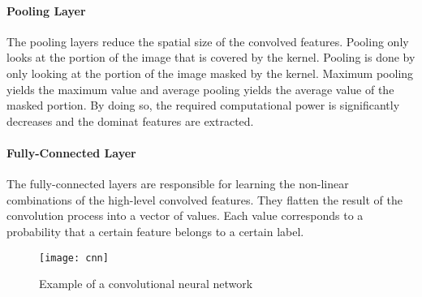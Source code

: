 \paragraph{Pooling Layer}
The pooling layers reduce the spatial size of the convolved features.
Pooling only looks at the portion of the image that is covered by the kernel.
Pooling is done by only looking at the portion of the image masked by the kernel.
Maximum pooling yields the maximum value and average pooling yields the average value of the masked portion.
By doing so, the required computational power is significantly decreases and the dominat features are extracted.
\\

\paragraph{Fully-Connected Layer}
The fully-connected layers are responsible for learning the non-linear combinations of the high-level convolved features.
They flatten the result of the convolution process into a vector of values.
Each value corresponds to a probability that a certain feature belongs to a certain label.

\begin{figure}[t]
  \centering
  \texttt{[image: cnn]}
  \caption{Example of a convolutional neural network}
  \label{fig:cnn}
\end{figure}
